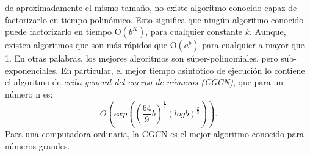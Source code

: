 de aproximadamente el mismo tamaño, no existe algoritmo conocido capaz de factorizarlo en tiempo polinómico. Esto significa que ningún algoritmo
conocido puede factorizarlo en tiempo O$(b^K)$, para cualquier constante $k$. Aunque, existen algoritmos que son más rápidos que O$(a^b)$ para cualquier a 
mayor que 1. En otras palabras, los mejores algoritmos son súper-polinomiales, pero sub-exponenciales. En particular, el mejor tiempo
asintótico de ejecución lo contiene el algoritmo de \textit{criba general del cuerpo de números (CGCN)}, que para un número n es:
\begin{equation}
    O\left(exp\left(\left(\frac{64}{9}b\right)^\frac{1}{3} \left(log b\right)^\frac{2}{3} \right) \right).
    \label{eq:O(clasico)}
\end{equation}
Para una computadora ordinaria, la CGCN es el mejor algoritmo conocido para números grandes. 